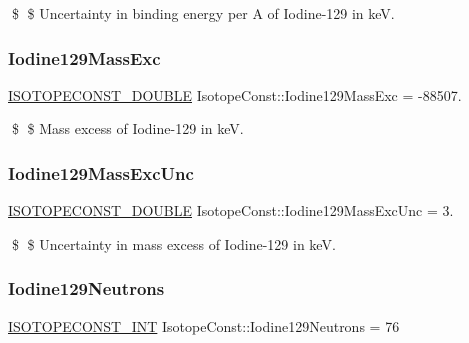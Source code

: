 \$ \$ Uncertainty in binding energy per A of Iodine-\/129 in keV. \mbox{\label{group___isotope_const-_iodine-_i129_ga5403138f7df46b47ff8f677d275c410c}} 
\subsubsection{\texorpdfstring{Iodine129\+Mass\+Exc}{Iodine129MassExc}}
{\footnotesize\ttfamily \mbox{\hyperlink{group___isotope_const-_macros_ga8f45a7272ce02c0b4c65c44636ed719a}{I\+S\+O\+T\+O\+P\+E\+C\+O\+N\+S\+T\+\_\+\+D\+O\+U\+B\+LE}} Isotope\+Const\+::\+Iodine129\+Mass\+Exc = -\/88507.}

\$ \$ Mass excess of Iodine-\/129 in keV. \mbox{\label{group___isotope_const-_iodine-_i129_gab1554d746b9462ee1868dca2115d5696}} 
\subsubsection{\texorpdfstring{Iodine129\+Mass\+Exc\+Unc}{Iodine129MassExcUnc}}
{\footnotesize\ttfamily \mbox{\hyperlink{group___isotope_const-_macros_ga8f45a7272ce02c0b4c65c44636ed719a}{I\+S\+O\+T\+O\+P\+E\+C\+O\+N\+S\+T\+\_\+\+D\+O\+U\+B\+LE}} Isotope\+Const\+::\+Iodine129\+Mass\+Exc\+Unc = 3.}

\$ \$ Uncertainty in mass excess of Iodine-\/129 in keV. \mbox{\label{group___isotope_const-_iodine-_i129_gae3226b9ea800300cf5e9921fc1fbc75a}} 
\subsubsection{\texorpdfstring{Iodine129\+Neutrons}{Iodine129Neutrons}}
{\footnotesize\ttfamily \mbox{\hyperlink{group___isotope_const-_macros_ga5f18360b3e99483a35c32d789e62621c}{I\+S\+O\+T\+O\+P\+E\+C\+O\+N\+S\+T\+\_\+\+I\+NT}} Isotope\+Const\+::\+Iodine129\+Neutrons = 76}

